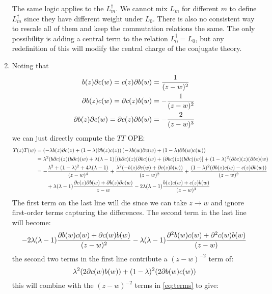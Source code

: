 \documentclass[11pt]{article}
\begin{document}
\begin{enumerate}
	 The same logic applies to the $L_m^\dagger$. We cannot mix $L_m$ for different $m$ to define $L_m^\dagger$ since they have different weight under $L_0$. There is also no consistent way to rescale all of them and keep the commutation relations the same. The only possibility is adding a central term to the relation $L_0^\dagger = L_0$, but any redefinition of this will modify the central charge of the conjugate theory. 
	
	
	
	\item Noting that
	\[
	\begin{aligned}
		b(z) \partial c(w) = c(z) \partial b(w) &= \frac{1}{(z-w)^2}\\
		\partial b(z) c(w) = \partial c(z) b(w) &= - \frac{1}{(z-w)^2}\\ 
		\partial b(z) \partial c(w) = \partial c(z) \partial b(w) &= -\frac{2}{(z-w)^3}
	\end{aligned}
	\]
	we can just directly compute the $TT$ OPE:
	\[
	\begin{aligned}
		T(z) T(w) &= \left(-\lambda b(z) \partial c(z) + (1-\lambda) \partial b(z) c(z) \right) \left(-\lambda b(w) \partial c(w) + (1-\lambda) \partial b(w) c(w) \right)\\
		&= \lambda^2 (b \partial c)(z) (b \partial c)(w) + \lambda (\lambda - 1)\left[ (b \partial c)(z) (\partial b c)(w) + (\partial b c) (z) (b \partial c)(w)\right] + (1-\lambda)^2 (\partial b c)(z) (\partial b c)(w)\\
		&= - \frac{\lambda^2 + (1-\lambda)^2 + 4 \lambda (\lambda-1) }{(z-w)^4} + \frac{\lambda^2 (-b(z) \partial c(w) + \partial c(z) b(w))}{(z-w)^2} + \frac{(1-\lambda)^2 (\partial b(z) c(w) - c(z) \partial b(w))}{(z-w)^2}\\
		&\qquad + \lambda (\lambda-1) \frac{\partial c(z) \partial b(w) + \partial b(z) \partial c(w)}{z-w} - 2 \lambda (\lambda-1) \frac{b(z) c(w) + c(z) b(w)}{(z-w)^3}
	\end{aligned}
	\]
	The first term on the last line will die since we can take $z \to w$ and ignore first-order terms capturing the differences. The second term in the last line will become:
	\begin{equation}\label{eq:terms}
		- 2 \lambda (\lambda - 1) \frac{\partial b(w) c(w) + \partial c(w) b(w)}{(z-w)^2} - \lambda (\lambda - 1) \frac{\partial^2 b(w) c(w) + \partial^2 c(w) b(w)}{(z-w)}
	\end{equation}
	the second two terms in the first line contribute a $(z-w)^{-2}$ term of:
	\[
		\lambda^2 (2 \partial c(w) b(w)) + (1-\lambda)^2 (2 \partial b(w) c(w))
	\]
	this will combine with the $(z-w)^{-2}$ terms in \eqref{eq:terms} to give:

\end{enumerate}
\end{document}

